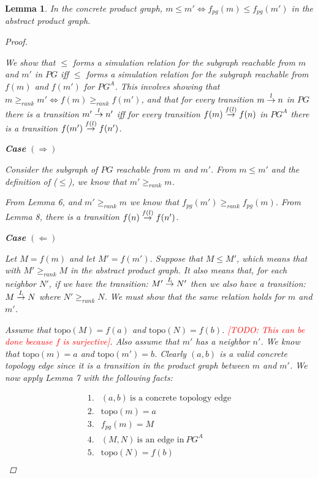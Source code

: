 \documentclass[twocolumn, openany]{sig-alternate-10pt}
\newcommand{\todo}[1]{\textcolor{red}{[TODO: #1]}}
\newcommand{\Topo}{\ensuremath{\mathrm{topo}}}
\newtheorem{lem}[thm]{Lemma}
\begin{document}
\begin{lem}
  In the concrete product graph, $m \leq m' \iff f_{pg}(m) \leq f_{pg}(m')$ in the abstract product graph.
  \begin{proof}
    $ $

    \vspace{1em}
    We show that $\leq$ forms a simulation relation for the subgraph reachable from $m$ and $m'$ in $PG$ iff $\leq$ forms a simulation relation for the subgraph reachable from $f(m)$ and $f(m')$ for $PG^A$. This involves showing that $m \geq_{rank} m' \iff f(m) \geq_{rank} f(m')$, and that 
    for every transition $\trans{m}{n}{l}$ in $PG$ there is a transition $\trans{m'}{n'}{l}$ iff for every transition $\trans{f(m)}{f(n)}{f(l)}$ in $PG^A$ there is a transition $\trans{f(m')}{f(n')}{f(l)}$.

    \vspace{1em}
    \textbf{Case} $(\Rightarrow)$

    Consider the subgraph of $PG$ reachable from $m$ and $m'$. From $m \leq m'$ and the definition of ($\leq$), we know that $m' \geq_{rank} m$. 

    From Lemma 6, and $m' \geq_{rank} m$ we know that $f_{pg}(m') \geq_{rank} f_{pg}(m)$. 
    From Lemma 8, there is a transition $\trans{f(n)}{f(n')}{f(l)}$.

    \vspace{1.2em}
    \textbf{Case} $(\Leftarrow)$

    Let $M = f(m)$ and let $M' = f(m')$.
    Suppose that $M \leq M'$, which means that with $M' \geq_{rank} M$ in the abstract product graph. It also means that, for each neighbor $N'$, if we have the transition: $\trans{M'}{N'}{L}$ then we also have a transition: $\trans{M}{N}{L}$ where $N' \geq_{rank} N$. We must show that the same relation holds for $m$ and $m'$. 

    \vspace{1em}
    Assume that $\Topo(M) = f(a)$ and $\Topo(N) = f(b)$. \todo{This can be done because $f$ is surjective}. Also assume that $m'$ has a neighbor $n'$. We know that $\Topo(m) = a$ and $\Topo(m') = b$. Clearly $(a,b)$ is a valid concrete topology edge since it is a transition in the product graph between $m$ and $m'$. We now apply Lemma 7 with the following facts:

    \[ \begin{array}{ll}
      1. & (a,b) ~\text{is a concrete topology edge} \\
      2. & \Topo(m) = a \\
      3. & f_{pg}(m) = M \\
      4. & (M,N) ~\text{is an edge in}~ PG^A \\
      5. & \Topo(N) = f(b) \\
    \end{array} \]


\end{proof}
\end{lem}
\end{document}
